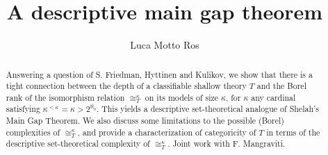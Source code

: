 \documentclass{amsart}
\begin{document}
\title{A descriptive main gap theorem}
\author{Luca Motto Ros}


\begin{abstract}
Answering a question of S. Friedman, Hyttinen and Kulikov, we show that there is a tight connection between the depth of a classifiable shallow theory $T$ and the Borel rank of the isomorphism relation $\cong^\kappa_T$ on its models of size $\kappa$, for $\kappa$ any cardinal satisfying $\kappa^{< \kappa} = \kappa > 2^{\aleph_0}$. This yields a descriptive set-theoretical analogue of Shelah’s Main Gap Theorem. We also discuss some limitations to the possible (Borel) complexities of $\cong^\kappa_T$, and provide a characterization of categoricity of $T$ in terms of the descriptive set-theoretical complexity of $\cong^\kappa_T$. Joint work with F. Mangraviti.
\end{abstract}


\maketitle
\end{document}

